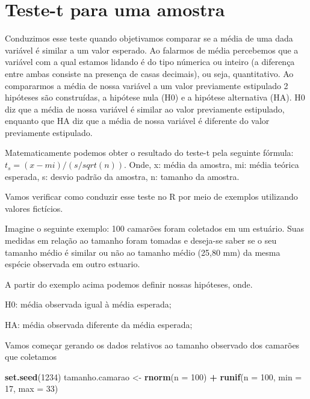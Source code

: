 \documentclass[]{book}
\newenvironment{Shaded}{\begin{snugshade}}{\end{snugshade}}
\newcommand{\DataTypeTok}[1]{\textcolor[rgb]{0.13,0.29,0.53}{#1}}
\newcommand{\DecValTok}[1]{\textcolor[rgb]{0.00,0.00,0.81}{#1}}
\newcommand{\KeywordTok}[1]{\textcolor[rgb]{0.13,0.29,0.53}{\textbf{#1}}}
\newcommand{\NormalTok}[1]{#1}
\newcommand{\OperatorTok}[1]{\textcolor[rgb]{0.81,0.36,0.00}{\textbf{#1}}}
\newcommand{\StringTok}[1]{\textcolor[rgb]{0.31,0.60,0.02}{#1}}
\begin{document}
\hypertarget{teste-t-para-uma-amostra}{%
\section{Teste-t para uma amostra}\label{teste-t-para-uma-amostra}}

Conduzimos esse teste quando objetivamos comparar se a média de uma dada variável é similar a um valor esperado. Ao falarmos de média percebemos que a variável com a qual estamos lidando é do tipo númerica ou inteiro (a diferença entre ambas consiste na presença de casas decimais), ou seja, quantitativo. Ao compararmos a média de nossa variável a um valor previamente estipulado 2 hipóteses são construídas, a hipótese nula (H0) e a hipótese alternativa (HA). H0 diz que a média de nossa variável é similar ao valor previamente estipulado, enquanto que HA diz que a média de nossa variável é diferente do valor previamente estipulado.

Matematicamente podemos obter o resultado do teste-t pela seguinte fórmula: \(t_s=(x-mi)/(s/sqrt(n))\). Onde, x: média da amostra, mi: média teórica esperada, s: desvio padrão da amostra, n: tamanho da amostra.

Vamos verificar como conduzir esse teste no R por meio de exemplos utilizando valores fictícios.

Imagine o seguinte exemplo: 100 camarões foram coletados em um estuário. Suas medidas em relação ao tamanho foram tomadas e deseja-se saber se o seu tamanho médio é similar ou não ao tamanho médio (25,80 mm) da mesma espécie observada em outro estuario.

A partir do exemplo acima podemos definir nossas hipóteses, onde.

H0: média observada igual à média esperada;

HA: média observada diferente da média esperada;

Vamos começar gerando os dados relativos ao tamanho observado dos camarões que coletamos

\begin{Shaded}
\begin{Highlighting}[]
\KeywordTok{set.seed}\NormalTok{(}\DecValTok{1234}\NormalTok{)}
\NormalTok{tamanho.camarao <-}\StringTok{ }\KeywordTok{rnorm}\NormalTok{(}\DataTypeTok{n =} \DecValTok{100}\NormalTok{) }\OperatorTok{+}\StringTok{ }\KeywordTok{runif}\NormalTok{(}\DataTypeTok{n =} \DecValTok{100}\NormalTok{, }\DataTypeTok{min =} \DecValTok{17}\NormalTok{, }\DataTypeTok{max =} \DecValTok{33}\NormalTok{)}
\end{Highlighting}
\end{Shaded}
\end{document}
